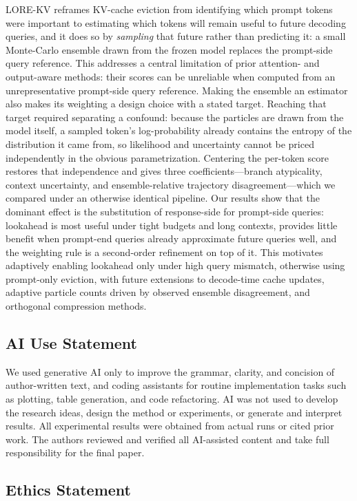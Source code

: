\documentclass{article} %
\begin{document}
LORE-KV reframes KV-cache eviction from identifying which prompt tokens were important to estimating which tokens will remain useful to future decoding queries, and it does so by \emph{sampling} that future rather than predicting it: a small Monte-Carlo ensemble drawn from the frozen model replaces the prompt-side query reference. This addresses a central limitation of prior attention- and output-aware methods: their scores can be unreliable when computed from an unrepresentative prompt-side query reference. Making the ensemble an estimator also makes its weighting a design choice with a stated target. Reaching that target required separating a confound: because the particles are drawn from the model itself, a sampled token's log-probability already contains the entropy of the distribution it came from, so likelihood and uncertainty cannot be priced independently in the obvious parametrization. Centering the per-token score restores that independence and gives three coefficients---branch atypicality, context uncertainty, and ensemble-relative trajectory disagreement---which we compared under an otherwise identical pipeline. Our results show that the dominant effect is the substitution of response-side for prompt-side queries: lookahead is most useful under tight budgets and long contexts, provides little benefit when prompt-end queries already approximate future queries well, and the weighting rule is a second-order refinement on top of it. This motivates adaptively enabling lookahead only under high query mismatch, otherwise using prompt-only eviction, with future extensions to decode-time cache updates, adaptive particle counts driven by observed ensemble disagreement, and orthogonal compression methods.


\subsection*{AI Use Statement}

We used generative AI only to improve the grammar, clarity, and concision of author-written text, and coding assistants for routine implementation tasks such as plotting, table generation, and code refactoring. AI was not used to develop the research ideas, design the method or experiments, or generate and interpret results. All experimental results were obtained from actual runs or cited prior work. The authors reviewed and verified all AI-assisted content and take full responsibility for the final paper.

\subsection*{Ethics Statement}
\end{document}

